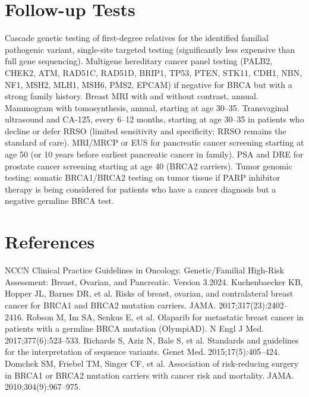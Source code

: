 \section*{Follow-up Tests}
Cascade genetic testing of first-degree relatives for the identified familial pathogenic variant, single-site targeted testing (significantly less expensive than full gene sequencing). Multigene hereditary cancer panel testing (PALB2, CHEK2, ATM, RAD51C, RAD51D, BRIP1, TP53, PTEN, STK11, CDH1, NBN, NF1, MSH2, MLH1, MSH6, PMS2, EPCAM) if negative for BRCA but with a strong family history. Breast MRI with and without contrast, annual. Mammogram with tomosynthesis, annual, starting at age 30--35. Transvaginal ultrasound and CA-125, every 6--12 months, starting at age 30--35 in patients who decline or defer RRSO (limited sensitivity and specificity; RRSO remains the standard of care). MRI/MRCP or EUS for pancreatic cancer screening starting at age 50 (or 10 years before earliest pancreatic cancer in family). PSA and DRE for prostate cancer screening starting at age 40 (BRCA2 carriers). Tumor genomic testing: somatic BRCA1/BRCA2 testing on tumor tissue if PARP inhibitor therapy is being considered for patients who have a cancer diagnosis but a negative germline BRCA test.

\section*{References}
NCCN Clinical Practice Guidelines in Oncology. Genetic/Familial High-Risk Assessment: Breast, Ovarian, and Pancreatic. Version 3.2024. Kuchenbaecker KB, Hopper JL, Barnes DR, et al. Risks of breast, ovarian, and contralateral breast cancer for BRCA1 and BRCA2 mutation carriers. JAMA. 2017;317(23):2402--2416. Robson M, Im SA, Senkus E, et al. Olaparib for metastatic breast cancer in patients with a germline BRCA mutation (OlympiAD). N Engl J Med. 2017;377(6):523--533. Richards S, Aziz N, Bale S, et al. Standards and guidelines for the interpretation of sequence variants. Genet Med. 2015;17(5):405--424. Domchek SM, Friebel TM, Singer CF, et al. Association of risk-reducing surgery in BRCA1 or BRCA2 mutation carriers with cancer risk and mortality. JAMA. 2010;304(9):967--975.

\clearpage
